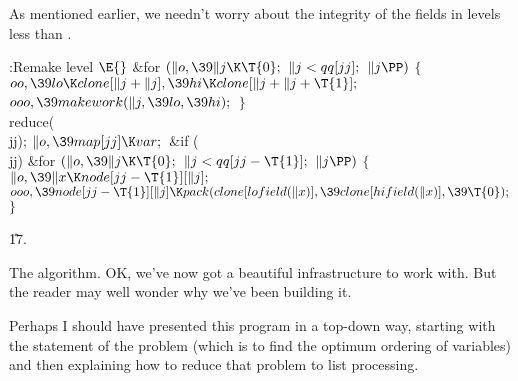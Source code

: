 As mentioned earlier, we needn't worry about the integrity
of the
 fields in levels less than .

\Y\B\4:Remake level \X${}\E{}$\6
\&{for} ${}(\|o,\39\|j\K\T{0};{}$ ${}\|j<\\{qq}[\\{jj}];{}$ ${}\|j\PP){}$\5
${}\{{}$\1\6
${}\\{oo},\39\\{lo}\K\\{clone}[\|j+\|j],\39\\{hi}\K\\{clone}[\|j+\|j+\T{1}];{}$%
\6
${}\\{ooo},\39\\{makework}(\|j,\39\\{lo},\39\\{hi});{}$\6
\4${}\}{}$\2\6
\\{reduce}(\\{jj});\6
${}\|o,\39\\{map}[\\{jj}]\K\\{var};{}$\6
\&{if} (\\{jj})\1\6
\&{for} ${}(\|o,\39\|j\K\T{0};{}$ ${}\|j<\\{qq}[\\{jj}-\T{1}];{}$ ${}\|j\PP){}$%
\5
${}\{{}$\1\6
${}\|o,\39\|x\K\\{node}[\\{jj}-\T{1}][\|j];{}$\6
${}\\{ooo},\39\\{node}[\\{jj}-\T{1}][\|j]\K\\{pack}(\\{clone}[\\{lofield}(%
\|x)],\39\\{clone}[\\{hifield}(\|x)],\39\T{0});{}$\6
\4${}\}{}$\2\2\par
\U17.\fi

The algorithm. OK, we've now got a beautiful
infrastructure to work with.
But the reader may well wonder why we've been building it.

Perhaps I should have presented this program in a top-down way,
starting with the statement of the problem (which is to find the optimum
ordering of variables) and then explaining how to reduce that problem
to list processing.


